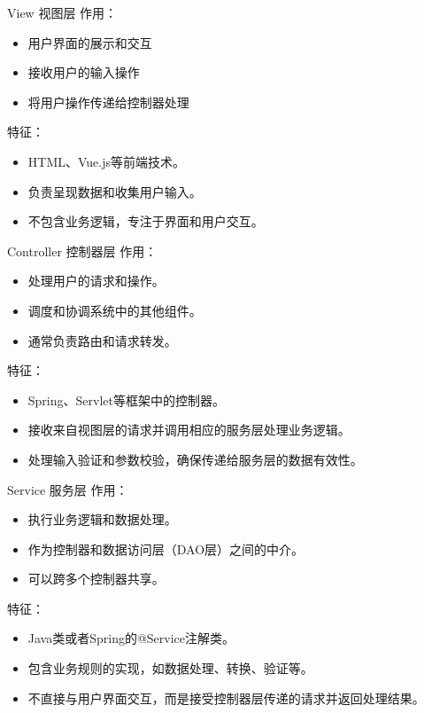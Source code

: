 \documentclass{beamer}
\begin{document}
\begin{frame}[fragile]{View 视图层}
作用：
    \begin{itemize}
    \item 用户界面的展示和交互
    \item 接收用户的输入操作
    \item 将用户操作传递给控制器处理
    \end{itemize}
特征：
    \begin{itemize}
    \item HTML、Vue.js等前端技术。
    \item 负责呈现数据和收集用户输入。
    \item 不包含业务逻辑，专注于界面和用户交互。
    \end{itemize}
\end{frame}

\begin{frame}[fragile]{Controller 控制器层}
作用：
    \begin{itemize}
    \item 处理用户的请求和操作。
    \item 调度和协调系统中的其他组件。
    \item 通常负责路由和请求转发。
    \end{itemize}
特征：
    \begin{itemize}
    \item Spring、Servlet等框架中的控制器。
    \item 接收来自视图层的请求并调用相应的服务层处理业务逻辑。
    \item 处理输入验证和参数校验，确保传递给服务层的数据有效性。
    \end{itemize}
\end{frame}
    
\begin{frame}[fragile]{Service 服务层}
作用：
    \begin{itemize}
    \item 执行业务逻辑和数据处理。
    \item 作为控制器和数据访问层（DAO层）之间的中介。
    \item 可以跨多个控制器共享。
    \end{itemize}
特征：
    \begin{itemize}
    \item Java类或者Spring的@Service注解类。
    \item 包含业务规则的实现，如数据处理、转换、验证等。
    \item 不直接与用户界面交互，而是接受控制器层传递的请求并返回处理结果。
    \end{itemize}
\end{frame}
        
\end{document}
